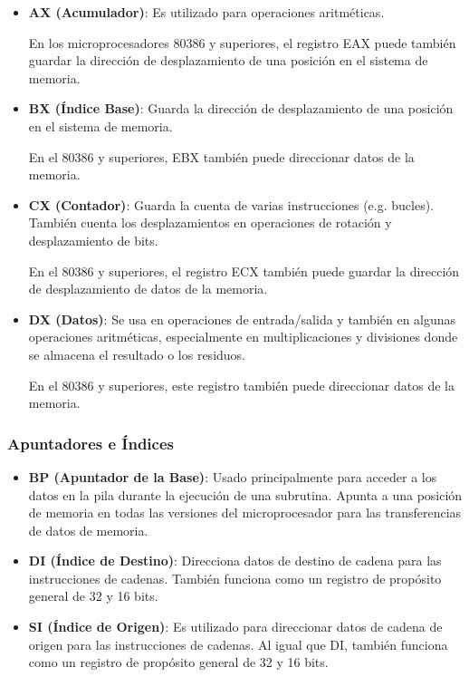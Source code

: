 	\begin{itemize}
		\item \textbf{AX (Acumulador)}: Es utilizado para operaciones aritméticas.

			En los microprocesadores 80386 y superiores, el registro EAX puede también
			guardar la dirección de desplazamiento de una posición en el sistema de
			memoria.

		\item \textbf{BX (Índice Base)}: Guarda la dirección de desplazamiento de una posición
			en el sistema de memoria.

			En el 80386 y superiores, EBX también puede direccionar datos de la memoria.

		\item \textbf{CX (Contador)}: Guarda la cuenta de varias instrucciones (e.g. bucles).
			También cuenta los desplazamientos en operaciones de rotación y desplazamiento
			de bits.

			En el 80386 y superiores, el registro ECX también puede guardar la dirección
			de desplazamiento de datos de la memoria.

		\item \textbf{DX (Datos)}: Se usa en operaciones de entrada/salida y también en algunas
			operaciones aritméticas, especialmente en multiplicaciones y divisiones donde
			se almacena el resultado o los residuos.

			En el 80386 y superiores, este registro también puede direccionar datos de la memoria.
	\end{itemize}

	\subsubsection{Apuntadores e Índices}

	\begin{itemize}
		\item \textbf{BP (Apuntador de la Base)}: Usado principalmente para acceder a los datos
			en la pila durante la ejecución de una subrutina. Apunta a una posición de
			memoria en todas las versiones del microprocesador para las transferencias de
			datos de memoria.

		\item \textbf{DI (Índice de Destino)}: Direcciona datos de destino de cadena para las
			instrucciones de cadenas. También funciona como un registro de propósito
			general de 32 y 16 bits.

		\item \textbf{SI (Índice de Origen)}: Es utilizado para direccionar datos de cadena
			de origen para las instrucciones de cadenas. Al igual que DI, también funciona
			como un registro de propósito general de 32 y 16 bits.
	\end{itemize}

